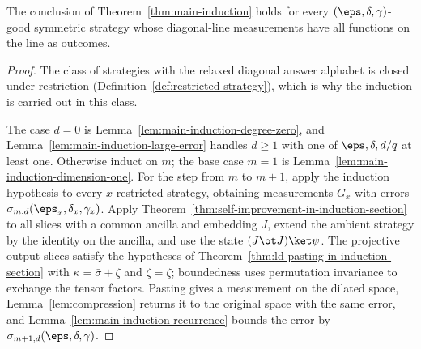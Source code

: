 \begin{lemma}\label{lem:answer-main-induction}
	\leanok
	The conclusion of Theorem~\ref{thm:main-induction} holds for every
	$(\eps,\delta,\gamma)$-good symmetric strategy whose diagonal-line
	measurements have all functions on the line as outcomes.
\end{lemma}
\begin{proof}
	\leanok
	The class of strategies with the relaxed diagonal answer alphabet is
	closed under restriction (Definition~\ref{def:restricted-strategy}),
	which is why the induction is carried out in this class.

	The case $d=0$ is Lemma~\ref{lem:main-induction-degree-zero}, and
	Lemma~\ref{lem:main-induction-large-error} handles $d\ge1$ with one of
	$\eps,\delta,d/q$ at least one.  Otherwise induct on $m$; the base case
	$m=1$ is Lemma~\ref{lem:main-induction-dimension-one}.  For the step from
	$m$ to $m+1$, apply the induction hypothesis to every $x$-restricted
	strategy, obtaining measurements $G_x$ with errors
	$\sigma_{m,d}(\eps_x,\delta_x,\gamma_x)$.  Apply
	Theorem~\ref{thm:self-improvement-in-induction-section} to all slices
	with a common ancilla and embedding $J$, extend the ambient strategy by
	the identity on the ancilla, and use the state $(J\ot J)\ket\psi$.  The
	projective output slices satisfy the hypotheses of
	Theorem~\ref{thm:ld-pasting-in-induction-section} with
	$\kappa=\bar\sigma+\bar\zeta$ and $\zeta=\bar\zeta$; boundedness uses
	permutation invariance to exchange the tensor factors.  Pasting gives a
	measurement on the dilated space, Lemma~\ref{lem:compression} returns it
	to the original space with the same error, and
	Lemma~\ref{lem:main-induction-recurrence} bounds the error by
	$\sigma_{m+1,d}(\eps,\delta,\gamma)$.
\end{proof}
